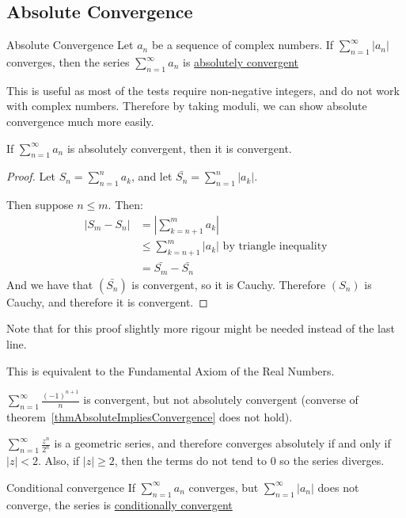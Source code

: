 \documentclass[../Main.tex]{subfiles}
\begin{document}
\subsection{Absolute Convergence}
\begin{definition}{Absolute Convergence}
    Let $a_n$ be a sequence of complex numbers. If $\sum_{n=1}^\infty |a_n|$ converges, then the series $\sum_{n=1}^\infty a_n$ is \underline{absolutely convergent}
\end{definition}
This is useful as most of the tests require non-negative integers, and do not work with complex numbers. Therefore by taking moduli, we can show absolute convergence much more easily.
\begin{theorem}
    If $\sum_{n=1}^\infty a_n$ is absolutely convergent, then it is convergent.
    \label{thmAbsoluteImpliesConvergence}
\end{theorem}
\begin{proof}
    Let $S_n = \sum_{n=1}^n a_k$, and let $\bar{S_n} = \sum_{n=1}^n |a_k|$.\par
    Then suppose $n \leq m$. Then:
    \begin{align*}
        |S_m - S_n| &= |\sum_{k=n+1}^m a_k| \\
        &\leq \sum_{k=n+1}^m |a_k| \text{ by triangle inequality} \\
        &= \bar{S_m} - \bar{S_n}
    \end{align*}
    And we have that $(\bar{S_n})$ is convergent, so it is Cauchy. Therefore $(S_n)$ is Cauchy, and therefore it is convergent.
\end{proof}
Note that for this proof slightly more rigour might be needed instead of the last line. \\
\begin{remark}
    This is equivalent to the Fundamental Axiom of the Real Numbers.
\end{remark}
\begin{examples}{}
    \item $\sum_{n=1}^\infty \frac{(-1)^{n+1}}{n}$ is convergent, but not absolutely convergent (converse of theorem~\ref{thmAbsoluteImpliesConvergence} does not hold).
    \item $\sum_{n=1}^\infty \frac{z^n}{2^n}$ is a geometric series, and therefore converges absolutely if and only if $|z| < 2$. Also, if $|z| \geq 2$, then the terms do not tend to 0 so the series diverges.
\end{examples}
\begin{definition}{Conditional convergence}
    If $\sum_{n=1}^\infty a_n$ converges, but $\sum_{n=1}^\infty |a_n|$ does not converge, the series is \underline{conditionally convergent}
\end{definition}
\end{document}
